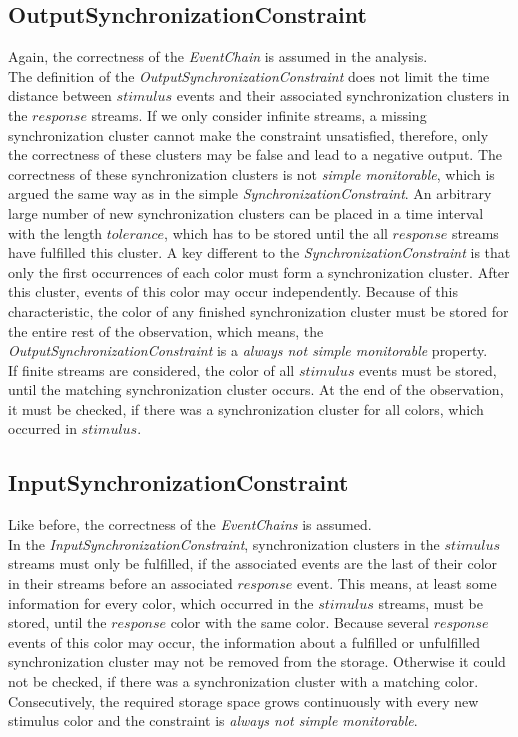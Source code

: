 \subsection{OutputSynchronizationConstraint}
	Again, the correctness of the \textit{EventChain} is assumed in the analysis.\\
	The definition of the \textit{OutputSynchronizationConstraint} does not limit the time distance between $stimulus$ events and their associated synchronization clusters in the $response$ streams. If we only consider infinite streams, a missing synchronization cluster cannot make the constraint unsatisfied, therefore, only the correctness of these clusters may be false and lead to a negative output. The correctness of these synchronization clusters is not \textit{simple monitorable}, which is argued the same way as in the simple \textit{SynchronizationConstraint}. An arbitrary large number of new synchronization clusters can be placed in a time interval with the length $tolerance$, which has to be stored until the all $response$ streams have fulfilled this cluster. A key different to the \textit{SynchronizationConstraint} is that only the first occurrences of each color must form a synchronization cluster. After this cluster, events of this color may occur independently. Because of this characteristic, the color of any finished synchronization cluster must be stored for the entire rest of the observation, which means, the \textit{OutputSynchronizationConstraint} is a \textit{always not simple monitorable} property.\\
	If finite streams are considered, the color of all $stimulus$ events must be stored, until the matching synchronization cluster occurs. At the end of the observation, it must be checked, if there was a synchronization cluster for all colors, which occurred in $stimulus$.
	

\subsection{InputSynchronizationConstraint}
	Like before, the correctness of the \textit{EventChains} is assumed.\\
	In the \textit{InputSynchronizationConstraint}, synchronization clusters in the $stimulus$ streams must only be fulfilled, if the associated events are the last of their color in their streams before an associated $response$ event. This means, at least some information for every color, which occurred in the $stimulus$ streams, must be stored, until the $response$ color with the same color.  Because several $response$ events of this color may occur, the information about a fulfilled or unfulfilled synchronization cluster may not be removed from the storage. Otherwise it could not be checked, if there was a synchronization cluster with a matching color. Consecutively, the required storage space grows continuously with every new stimulus color and the constraint is \textit{always not simple monitorable}. 
	
